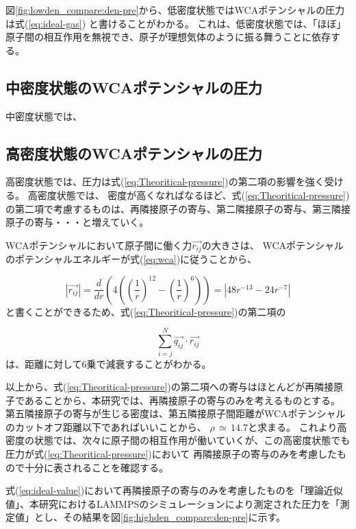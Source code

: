 \documentclass[titlepage]{jsreport}
\begin{document}
{{{図\ref{fig:lowden_compare:den-pre}から、低密度状態ではWCAポテンシャルの圧力は式(\ref{eq:ideal-gas})
と書けることがわかる。
これは、低密度状態では、「ほぼ」原子間の相互作用を無視でき、原子が理想気体のように振る舞うことに依存する。


\subsection{中密度状態のWCAポテンシャルの圧力}\label{results-subsec:WCA-press-middle-density}
中密度状態では、


\subsection{高密度状態のWCAポテンシャルの圧力}\label{results-subsec:WCA-press-high-density}
高密度状態では、圧力は式(\ref{eq:Theoritical-pressure})の第二項の影響を強く受ける。
高密度状態では、
密度が高くなればなるほど、式(\ref{eq:Theoritical-pressure})の第二項で考慮するものは、再隣接原子の寄与、第二隣接原子の寄与、第三隣接原子の寄与・・・と増えていく。

WCAポテンシャルにおいて原子間に働く力$\vec{r_{ij}}$の大きさは、
WCAポテンシャルのポテンシャルエネルギーが式(\ref{eq:wca})に従うことから、

\large
\begin{equation}
    | {\vec{r_{ij}}} |=\frac{d}{dr}\left(4\left(\left(\frac{1}{r}\right)^{12}-\left(\frac{1}{r}\right)^6\right)\right)=| 48r^{-13}-24r^{-7} |\label{eq:power}
\end{equation}
\normalsize
と書くことができるため、式(\ref{eq:Theoritical-pressure})の第二項の

\large
\begin{equation}
    \sum_{i=j}^N\vec{q_{ij}} \cdot \vec{r_{ij}} \label{eq:}
\end{equation}
\normalsize
は、距離に対して6乗で減衰することがわかる。

以上から、式(\ref{eq:Theoritical-pressure})の第二項への寄与はほとんどが再隣接原子であることから、本研究では、再隣接原子の寄与のみを考えるものとする。
第五隣接原子の寄与が生じる密度は、第五隣接原子間距離がWCAポテンシャルのカットオフ距離以下であればいいことから、
$\rho\,{\simeq}\,14.7$と求まる。
これより高密度の状態では、次々に原子間の相互作用が働いていくが、この高密度状態でも圧力が式(\ref{eq:Theoritical-pressure})において
再隣接原子の寄与のみを考慮したもので十分に表されることを確認する。

式(\ref{eq:ideal-value})において再隣接原子の寄与のみを考慮したものを「理論近似値」、本研究におけるLAMMPSのシミュレーションにより測定された圧力を「測定値」とし、その結果を図\ref{fig:highden_compare:den-pre}に示す。

}}}
\end{document}
